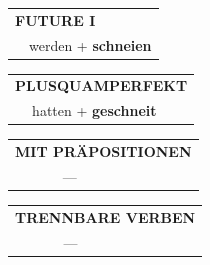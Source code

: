 \documentclass[10pt,a4paper]{revtex4-2}
\begin{document}
\begin{verbbox}
\begin{tabular}{rl}
    \multicolumn{2}{l}{\textbf{FUTURE I} }\\
  &  werden + \textbf{schneien}\\
 
  \end{tabular}
\hfill
   \begin{tabular}{rl}
      \multicolumn{2}{l}{\textbf{PLUSQUAMPERFEKT}}\\
  &  hatten + \textbf{geschneit}\\
  \end{tabular}
  
  \vspace{10pt}



\begin{tabular}{lll}
\multicolumn{3}{l}{\textbf{MIT PRÄPOSITIONEN}}\\
& ---\\
\end{tabular}
\hfill
\begin{tabular}{lll}
\multicolumn{3}{l}{\textbf{TRENNBARE VERBEN}}\\
& ---\\
\end{tabular}

  \vspace{-5pt}

\end{verbbox}
\end{document}
